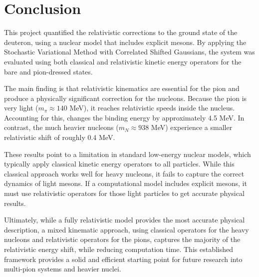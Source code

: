 \documentclass[a4paper,oneside,article,12pt]{memoir}
\begin{document}
\newpage
\chapter{Conclusion}
This project quantified the relativistic corrections to the ground state of the deuteron, using a nuclear model that includes explicit mesons. By applying the Stochastic Variational Method with Correlated Shifted Gaussians, the system was evaluated using both classical and relativistic kinetic energy operators for the bare and pion-dressed states.

The main finding is that relativistic kinematics are essential for the pion and produce a physically significant correction for the nucleons. Because the pion is very light ($m_π \approx 140$ MeV), it reaches relativistic speeds inside the nucleus. Accounting for this, changes the binding energy by approximately 4.5 MeV. In contrast, the much heavier nucleons ($m_N \approx 938$ MeV) experience a smaller relativistic shift of roughly 0.4 MeV.

These results point to a limitation in standard low-energy nuclear models, which typically apply classical kinetic energy operators to all particles. While this classical approach works well for heavy nucleons, it fails to capture the correct dynamics of light mesons. If a computational model includes explicit mesons, it must use relativistic operators for those light particles to get accurate physical results.

Ultimately, while a fully relativistic model provides the most accurate physical description, a mixed kinematic approach, using classical operators for the heavy nucleons and relativistic operators for the pions, captures the majority of the relativistic energy shift, while reducing computation time. This established framework provides a solid and efficient starting point for future research into multi-pion systems and heavier nuclei. 
\end{document}

